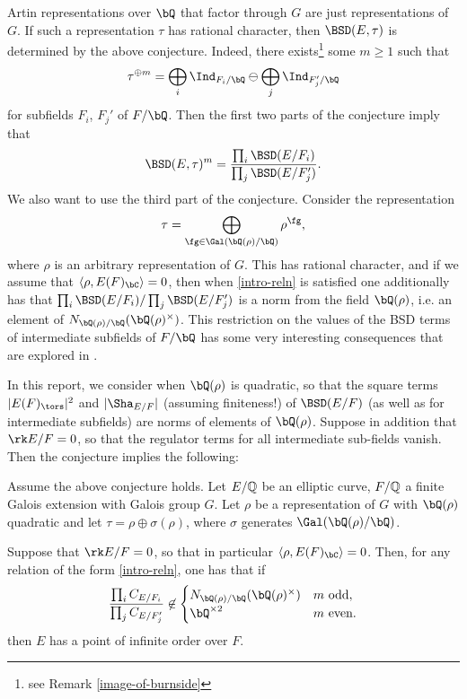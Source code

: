 Artin representations over $\bQ$ that factor through $G$ are just representations of $G$. If such a representation $\tau$ has rational character, then $\BSD(E, \tau)$ is determined by the above conjecture. Indeed, there exists\footnote{see Remark \ref{image-of-burnside}} some $m \geq 1$ such that
\begin{equation}\label{intro-reln}
     \tau^{\oplus m} = \bigoplus_i \Ind_{F_i / \bQ} \ominus \bigoplus_j\Ind_{F_j' / \bQ}
\end{equation}
for subfields $F_i$, $F_j'$ of $F / \bQ$. Then the first two parts of the conjecture imply that 
\[
\BSD(E, \tau)^{m} = \frac{\prod_i \BSD(E / F_i)}{\prod_j \BSD(E / F_j')} .
\]
We also want to use the third part of the conjecture. Consider the representation $$\tau = \bigoplus_{\fg \in \Gal(\bQ(\rho) / \bQ)} \rho^{\fg},$$
where $\rho$ is an arbitrary representation of $G$. This has rational character, and if we assume that $\langle \rho, E(F)_{\bC} \rangle = 0$, then when \eqref{intro-reln} is satisfied one additionally has that $\prod_i \BSD(E / F_i) / \prod_j \BSD(E / F_j')$ is a norm from the field $\bQ(\rho)$, i.e. an element of $N_{\bQ(\rho) / \bQ}(\bQ(\rho)^{\times})$.
This restriction on the values of the BSD terms of intermediate subfields of $F / \bQ$ has some very interesting consequences that are explored in \cite[\S3]{DEW1}.

In this report, we consider when $\bQ(\rho)$ is quadratic, so that the square terms $|E(F)_{\tors}|^2$ and $|\Sha_{E / F}|$ (assuming finiteness!) of $\BSD(E / F)$ (as well as for intermediate subfields) are norms of elements of $\bQ(\rho)$. Suppose in addition that $\rk E / F = 0$, so that the regulator terms for all intermediate sub-fields vanish. Then the conjecture implies the following:

\begin{thm*}[= Theorem \ref{thm_positive_rank}, 
    {\cite[Theorem 33]{DEW1}}]
    Assume the above conjecture holds. Let $E/\mathbb{Q}$ be an elliptic curve, $F/\mathbb{Q}$ a finite Galois extension with Galois group $G$. Let $\rho$ be a representation of $G$ with $\bQ(\rho)$ quadratic and let $\tau = \rho \oplus \sigma(\rho)$, where $\sigma$ generates $\Gal(\bQ(\rho) / \bQ)$. 
    
    Suppose that $\rk E / F = 0$, so that in particular $\langle \rho, E(F)_{\bC} \rangle = 0$.
    Then, for any relation of the form \eqref{intro-reln}, one has that if 
    $$\frac{\prod_i C_{E/F_i}}{\prod_j C_{E/F'_j}} \not\in \begin{cases} N_{\bQ(\rho) / \bQ}(\bQ(\rho)^{\times}) & m \text{ odd}, \\
        \bQ^{\times 2} & m \text{ even}.\end{cases}$$
    then $E$ has a point of infinite order over $F$.
\end{thm*}

